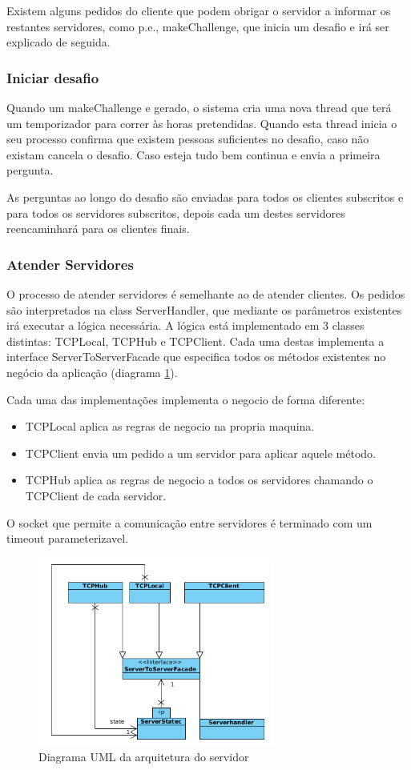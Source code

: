\documentclass[runningheads,a4paper]{llncs}
\begin{document}
Existem alguns pedidos do cliente que podem obrigar o servidor a informar os restantes servidores, como p.e., makeChallenge, que inicia um desafio e irá ser explicado de seguida.

\subsubsection{Iniciar desafio}

Quando um makeChallenge e gerado, o sistema cria uma nova thread que terá um temporizador para correr às horas pretendidas. Quando esta thread inicia o seu processo confirma que existem pessoas suficientes no desafio, caso não existam cancela o desafio. Caso esteja tudo bem continua e envia a primeira pergunta.

As perguntas ao longo do desafio são enviadas para todos os clientes subscritos e para todos os servidores subscritos, depois cada um destes servidores reencaminhará para os clientes finais.

\subsubsection{Atender Servidores}

O processo de atender servidores é semelhante ao de atender clientes. Os pedidos são interpretados na class ServerHandler, que mediante os parâmetros existentes irá executar a lógica necessária.
A lógica está implementado em 3 classes distintas: TCPLocal, TCPHub e TCPClient. Cada uma destas implementa a interface ServerToServerFacade que especifica todos os métodos existentes no negócio da aplicação (diagrama \ref{fig:diagram-facades}).

Cada uma das implementações implementa o negocio de forma diferente:
\begin{itemize}
\item TCPLocal aplica as regras de negocio na propria maquina.
\item TCPClient envia um pedido a um servidor para aplicar aquele método.
\item TCPHub aplica as regras de negocio a todos os servidores chamando o TCPClient de cada servidor.
\end{itemize}

O socket que permite a comunicação entre servidores é terminado com um timeout parameterizavel.

\begin{figure}
\centering
\includegraphics[height=6.2cm]{facades.png}
\caption{Diagrama UML da arquitetura do servidor}
\label{fig:diagram-facades}
\end{figure}
\end{document}
